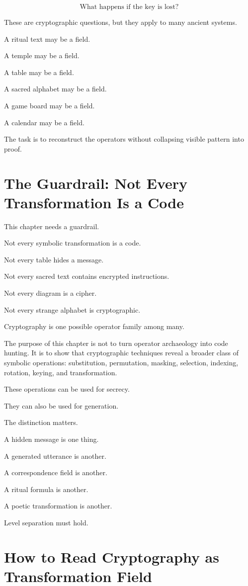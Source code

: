 \documentclass[11pt]{book}
\begin{document}
\[
\text{What happens if the key is lost?}
\]

These are cryptographic questions, but they apply to many ancient systems.

A ritual text may be a field.

A temple may be a field.

A table may be a field.

A sacred alphabet may be a field.

A game board may be a field.

A calendar may be a field.

The task is to reconstruct the operators without collapsing visible pattern into proof.

\section{The Guardrail: Not Every Transformation Is a Code}

This chapter needs a guardrail.

Not every symbolic transformation is a code.

Not every table hides a message.

Not every sacred text contains encrypted instructions.

Not every diagram is a cipher.

Not every strange alphabet is cryptographic.

Cryptography is one possible operator family among many.

The purpose of this chapter is not to turn operator archaeology into code hunting. It is to show that cryptographic techniques reveal a broader class of symbolic operations: substitution, permutation, masking, selection, indexing, rotation, keying, and transformation.

These operations can be used for secrecy.

They can also be used for generation.

The distinction matters.

A hidden message is one thing.

A generated utterance is another.

A correspondence field is another.

A ritual formula is another.

A poetic transformation is another.

Level separation must hold.

\section{How to Read Cryptography as Transformation Field}
\end{document}
